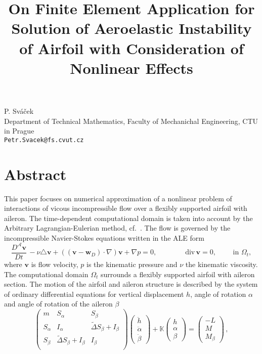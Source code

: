 \title{On Finite Element Application for Solution of Aeroelastic Instability of Airfoil with Consideration of Nonlinear Effects}
\author{} \institute{}
\maketitle

\begin{center}
{\large P. Sv\' a\v cek}\\
{Department of Technical Mathematics, Faculty of Mechanichal Engineering, CTU in Prague}\\
{\tt Petr.Svacek@fs.cvut.cz}
\end{center}

\section*{Abstract}
This paper focuses on numerical approximation of a nonlinear problem of interactions of vicous incompressible flow over a flexibly supported airfoil with aileron.
The time-dependent computational domain is taken into account by the Arbitrary Lagrangian-Eulerian method, cf.~\cite{Sva1}. The flow is governed by the incompressible Navier-Stokes equations written in the ALE form 
\begin{equation}
\label{eq:NS}
\frac{D^{\mathcal A} {\mathbf v} }{D t} \, - \nu \triangle {\mathbf v} + (({\mathbf v}-{\mathbf w}_D)\cdot\nabla) {\mathbf v} + \nabla p = 0,  \qquad\qquad
\mbox{div}\, {\mathbf v} = 0, \qquad \mbox{ in } \Omega_t,
\end{equation}
where $\mathbf v$ is flow velocity, $p$ is the kinematic pressure and $\nu$ the kinematic viscosity. The computational domain $\Omega_t$ surrounds a flexibly supported airfoil with aileron section. The motion of the airfoil and aileron structure is described by the system of  ordinary differential equations for vertical displacement $h$, angle of rotation $\alpha$ and angle of rotation of the aileron $\beta$
\begin{equation}
\label{eq:ODE3}
\left(
\begin{array}{ccc}
m & S_\alpha & S_\beta \\
S_\alpha & I_\alpha & \widetilde{\Delta} S_\beta  + I_\beta \\
S_\beta & \widetilde{\Delta} S_\beta + I_\beta & I_\beta \\
\end{array}
\right)
\left( \begin{array}{c} \ddot{h} \\ \ddot{\alpha} \\ \ddot{\beta} \end{array} \right) + {\mathbb K} \left( \begin{array}{c} h \\ \alpha \\ \beta\end{array} \right) = \left( \begin{array}{c} -L  \\ M \\ M_\beta\end{array} \right)\,,
\end{equation}
